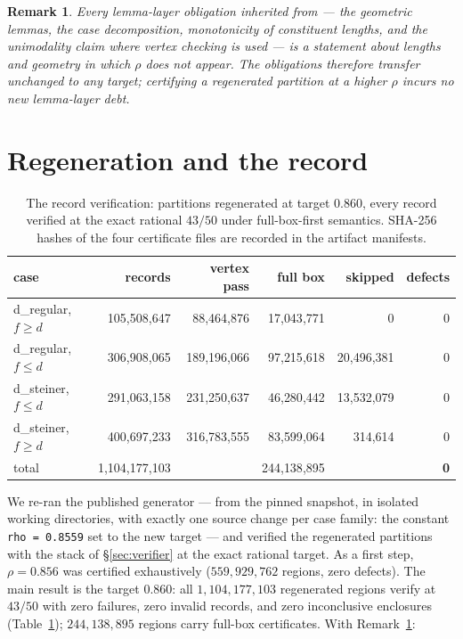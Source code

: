 \documentclass[11pt]{article}
\newtheorem{remark}{Remark}
\newcommand{\rr}{\rho}
\begin{document}
\begin{remark}\label{rem:uniform}
Every lemma-layer obligation inherited from \cite{PKU26} --- the
geometric lemmas, the case decomposition, monotonicity of constituent
lengths, and the unimodality claim where vertex checking is used --- is a
statement about lengths and geometry in which $\rr$ does not appear.
The obligations therefore transfer unchanged to any target; certifying a
regenerated partition at a higher $\rr$ incurs no new lemma-layer debt.
\end{remark}

\section{Regeneration and the record}\label{sec:record}

\begin{table}[t]
\centering
\begin{tabular}{lrrrrr}
\toprule
case & records & vertex pass & full box & skipped & defects \\
\midrule
d\_regular, $f\ge d$ & 105{,}508{,}647 & 88{,}464{,}876 & 17{,}043{,}771 & 0 & 0 \\
d\_regular, $f\le d$ & 306{,}908{,}065 & 189{,}196{,}066 & 97{,}215{,}618 & 20{,}496{,}381 & 0 \\
d\_steiner, $f\le d$ & 291{,}063{,}158 & 231{,}250{,}637 & 46{,}280{,}442 & 13{,}532{,}079 & 0 \\
d\_steiner, $f\ge d$ & 400{,}697{,}233 & 316{,}783{,}555 & 83{,}599{,}064 & 314{,}614 & 0 \\
\midrule
total & 1{,}104{,}177{,}103 & & 244{,}138{,}895 & & \textbf{0} \\
\bottomrule
\end{tabular}
\caption{The record verification: partitions regenerated at target
$0.860$, every record verified at the exact rational $43/50$ under
full-box-first semantics. SHA-256 hashes of the four certificate files
are recorded in the artifact manifests.}
\label{tab:record}
\end{table}

We re-ran the published generator --- from the pinned snapshot, in
isolated working directories, with exactly one source change per case
family: the constant \texttt{rho = 0.8559} set to the new target --- and
verified the regenerated partitions with the stack of
\S\ref{sec:verifier} at the exact rational target. As a first step,
$\rr = 0.856$ was certified exhaustively ($559{,}929{,}762$ regions,
zero defects). The main result is the target $0.860$:
all $1{,}104{,}177{,}103$ regenerated regions verify at $43/50$ with
zero failures, zero invalid records, and zero inconclusive enclosures
(Table~\ref{tab:record}); $244{,}138{,}895$ regions carry full-box
certificates. With Remark~\ref{rem:uniform}:
\end{document}
